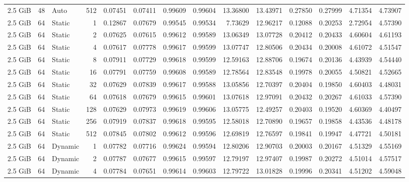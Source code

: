 \begin{table}[H]
\begin{adjustbox}{width=\textwidth, keepaspectratio}
\begin{tabular}{rrlrrrrrrrrrrr}
                    2.5 GiB & 48 & Auto & 512 & 0.07451 & 0.07411 & 0.99609 & 0.99604 & 13.36800 & 13.43971 & 0.27850 & 0.27999 & 4.71354 & 4.73907 \\
                    2.5 GiB & 64 & Static & 1 & 0.12867 & 0.07679 & 0.99545 & 0.99534 & 7.73629 & 12.96217 & 0.12088 & 0.20253 & 2.72954 & 4.57390 \\
                    2.5 GiB & 64 & Static & 2 & 0.07625 & 0.07615 & 0.99612 & 0.99589 & 13.06349 & 13.07728 & 0.20412 & 0.20433 & 4.60604 & 4.61193 \\
                    2.5 GiB & 64 & Static & 4 & 0.07617 & 0.07778 & 0.99617 & 0.99599 & 13.07747 & 12.80506 & 0.20434 & 0.20008 & 4.61072 & 4.51547 \\
                    2.5 GiB & 64 & Static & 8 & 0.07911 & 0.07729 & 0.99618 & 0.99599 & 12.59163 & 12.88706 & 0.19674 & 0.20136 & 4.43939 & 4.54440 \\
                    2.5 GiB & 64 & Static & 16 & 0.07791 & 0.07759 & 0.99608 & 0.99589 & 12.78564 & 12.83548 & 0.19978 & 0.20055 & 4.50821 & 4.52665 \\
                    2.5 GiB & 64 & Static & 32 & 0.07629 & 0.07839 & 0.99617 & 0.99588 & 13.05856 & 12.70397 & 0.20404 & 0.19850 & 4.60403 & 4.48031 \\
                    2.5 GiB & 64 & Static & 64 & 0.07618 & 0.07679 & 0.99615 & 0.99601 & 13.07618 & 12.97091 & 0.20432 & 0.20267 & 4.61033 & 4.57390 \\
                    2.5 GiB & 64 & Static & 128 & 0.07629 & 0.07973 & 0.99619 & 0.99606 & 13.05775 & 12.49257 & 0.20403 & 0.19520 & 4.60369 & 4.40497 \\
                    2.5 GiB & 64 & Static & 256 & 0.07919 & 0.07837 & 0.99618 & 0.99595 & 12.58018 & 12.70890 & 0.19657 & 0.19858 & 4.43536 & 4.48178 \\
                    2.5 GiB & 64 & Static & 512 & 0.07845 & 0.07802 & 0.99612 & 0.99596 & 12.69819 & 12.76597 & 0.19841 & 0.19947 & 4.47721 & 4.50181 \\
                    2.5 GiB & 64 & Dynamic & 1 & 0.07782 & 0.07716 & 0.99624 & 0.99594 & 12.80206 & 12.90703 & 0.20003 & 0.20167 & 4.51329 & 4.55169 \\
                    2.5 GiB & 64 & Dynamic & 2 & 0.07787 & 0.07677 & 0.99615 & 0.99597 & 12.79197 & 12.97407 & 0.19987 & 0.20272 & 4.51014 & 4.57517 \\
                    2.5 GiB & 64 & Dynamic & 4 & 0.07784 & 0.07651 & 0.99614 & 0.99603 & 12.79722 & 13.01828 & 0.19996 & 0.20341 & 4.51202 & 4.59048 \\

\end{tabular}
\end{adjustbox}
\end{table}
